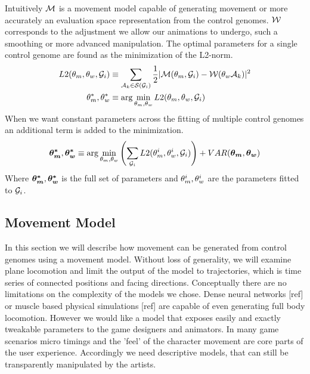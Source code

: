 Intuitively $\mathcal{M}$ is a movement model capable of generating movement or more accurately an evaluation space representation from the control genomes. $\mathcal{W}$ corresponds to the adjustment we allow our animations to undergo, such a smoothing or more advanced manipulation. The optimal parameters for a single control genome are found as the minimization of the L2-norm.
\begin{subequations}
\begin{align}
    {L2}(\theta_{m},\theta_{w},\mathcal{G}_i)
    &\equiv
    \sum_{\mathcal{A}_k\in\mathcal{S}(\mathcal{G}_i)}
    {
        \frac{1}{2}
        |\mathcal{M}(\theta_{m},\mathcal{G}_i)
        -
        \mathcal{W}(\theta_{w}\mathcal{A}_k)|^2
    }
    \label{eq:optim:single}
    \\
    \theta_{m}^*,\theta_{w}^*
    &\equiv \arg\min_{\theta_{m},\theta_{w}}
    {
        {L2}(\theta_{m},\theta_{w},\mathcal{G}_i)
    }
\end{align}
\end{subequations}
When we want constant parameters across the fitting of multiple control genomes an additional term is added to the minimization. 
\begin{equation}
    \boldsymbol{\theta_{m}^* },\boldsymbol{\theta_{w}^* }
    \equiv 
    \arg\min_{\theta_{m},\theta_{w}}
    \left(
        \sum_{\mathcal{G}_i}
        {L2}(\theta_{m}^i,\theta_{w}^i,\mathcal{G}_i)
    \right)
    +
    VAR(\boldsymbol{\theta_{m} },\boldsymbol{\theta_{w} })
\end{equation}
Where $\boldsymbol{\theta_{m}^* },\boldsymbol{\theta_{w}^* }$ is the full set of parameters and $\theta_{m}^i,\theta_{w}^i$ are the parameters fitted to $\mathcal{G}_i$.

\subsection{Movement Model}
In this section we will describe how movement can be generated from control genomes using a movement model. Without loss of generality, we will examine plane locomotion and limit the output of the model to trajectories, which is time series of connected positions and facing directions. 
Conceptually there are no limitations on the complexity of the models we chose. Dense neural networks [ref] or muscle based physical simulations [ref] are capable of even generating full body locomotion. However we would like a model that exposes easily and exactly tweakable parameters to the game designers and animators. In many game scenarios micro timings and the 'feel' of the character movement are core parts of the user experience. Accordingly we need descriptive models, that can still be transparently manipulated by the artists. 

